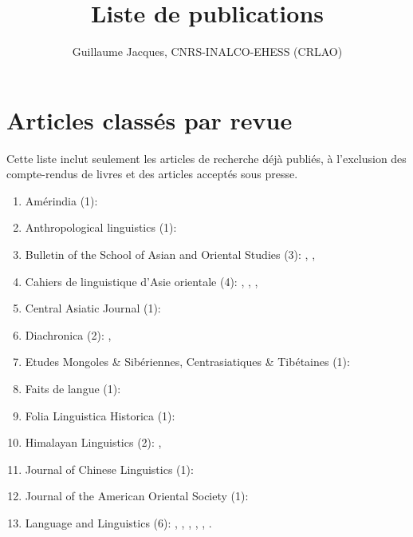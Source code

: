 \documentclass[oldfontcommands,oneside,a4paper,11pt]{article}
\newcommand{\langue}[2]{#2}
\begin{document}
  \title{\langue{List of publications}{Liste de publications}}
 
\author{Guillaume Jacques, CNRS-INALCO-EHESS (CRLAO)}
\maketitle
\sloppy
 
 \tableofcontents
  
 \section{\langue{By journals}{Articles classés par revue}}
Cette liste inclut seulement les articles de recherche déjà publiés, à l'exclusion des compte-rendus de livres et des articles acceptés sous presse.
 \begin{enumerate}
 \item Amérindia (1): \citet{jacques12bear}
 \item Anthropological linguistics (1): \citet{japhug14ideophones}
 \item Bulletin of the School of Asian and Oriental Studies (3):  \citet{jacques10refl}, \citet{rg-gj12yod}, \citet{jacques13yod}
 \item Cahiers de linguistique d'Asie orientale (4): \citet{jacques00ywij},  \citet{jacques03dissimilation},   \citet{jacques07chang},  \citet{michaud10bonin}
 \item Central Asiatic Journal (1):  \citet{jacques10imperial}
  \item Diachronica (2): \citet{jacques.michaud11naish}, \citet{michaud-jacques12nasalite}
  \item Etudes Mongoles \& Sibériennes, Centrasiatiques \& Tibétaines (1):  \citet{jacques09e}
  \item Faits de langue (1): \citet{jacques07redupl}
 \item Folia Linguistica Historica (1): \citet{jacques13arapaho}
 \item Himalayan Linguistics (2): \citet{jacques10zos},  \citet{jacques14rtau}
 \item Journal of Chinese Linguistics (1):   \citet{jacques11tangut.verb}
 \item Journal of the American Oriental Society (1): \citet{jacques11ngwemi}
   \item Language and Linguistics (6):  \citet{jacques07passif}, \citet{jacques09tangutverb}, \citet{jacques10inverse},     \citet{jacques11pumi.tone}, \citet{jacques12agreement},    \citet{jacques12khaling}.  

\end{enumerate}
\end{document}
